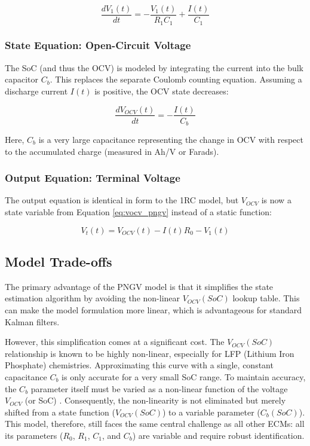 \documentclass[]{article}
\begin{document}
\begin{equation}
	\label{eq:v1_pngv}
	\frac{dV_1(t)}{dt} = - \frac{V_1(t)}{R_1 C_1} + \frac{I(t)}{C_1}
\end{equation}

\subsubsection{State Equation: Open-Circuit Voltage}
The SoC (and thus the OCV) is modeled by integrating the current into the bulk capacitor $C_b$. This replaces the separate Coulomb counting equation. Assuming a discharge current $I(t)$ is positive, the OCV state decreases:

\begin{equation}
	\label{eq:vocv_pngv}
	\frac{dV_{OCV}(t)}{dt} = - \frac{I(t)}{C_b}
\end{equation}

Here, $C_b$ is a very large capacitance representing the change in OCV with respect to the accumulated charge (measured in Ah/V or Farads).

\subsubsection{Output Equation: Terminal Voltage}
The output equation is identical in form to the 1RC model, but $V_{OCV}$ is now a state variable from Equation \ref{eq:vocv_pngv} instead of a static function:

\begin{equation}
	\label{eq:vt_pngv}
	V_t(t) = V_{OCV}(t) - I(t)R_0 - V_1(t)
\end{equation}

\subsection{Model Trade-offs}
The primary advantage of the PNGV model is that it simplifies the state estimation algorithm by avoiding the non-linear $V_{OCV}(SoC)$ lookup table. This can make the model formulation more linear, which is advantageous for standard Kalman filters.

However, this simplification comes at a significant cost. The $V_{OCV}(SoC)$ relationship is known to be highly non-linear, especially for LFP (Lithium Iron Phosphate) chemistries. Approximating this curve with a single, constant capacitance $C_b$ is only accurate for a very small SoC range. To maintain accuracy, the $C_b$ parameter itself must be varied as a non-linear function of the voltage $V_{OCV}$ (or SoC) \cite{tekin2024comparative}. Consequently, the non-linearity is not eliminated but merely shifted from a state function ($V_{OCV}(SoC)$) to a variable parameter ($C_b(SoC)$). This model, therefore, still faces the same central challenge as all other ECMs: all its parameters ($R_0$, $R_1$, $C_1$, and $C_b$) are variable and require robust identification.
\end{document}

